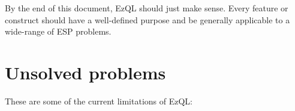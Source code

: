 \documentclass{report}
\begin{document}





By the end of this document, EzQL should just make sense. Every
feature or construct should have a well-defined purpose and be
generally applicable to a wide-range of ESP problems.

\section{Unsolved problems}
\label{sec:unsolved-problems}

These are some of the current limitations of EzQL:
\end{document}
